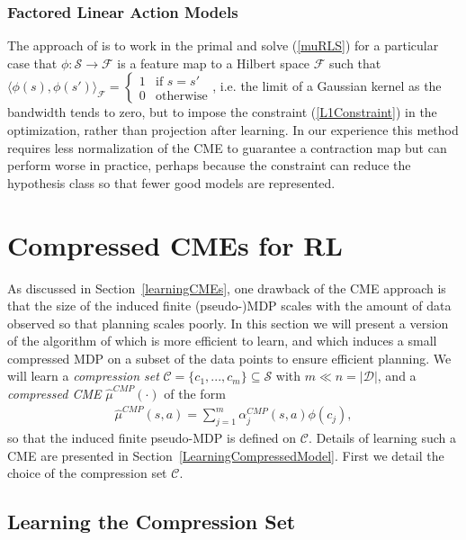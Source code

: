 \documentclass[letterpaper]{article}
\newcommand{\CsabaFLAM}{DBLP:conf/adprl/YaoSPZ14}
\newcommand{\GrunewalderEmbeddingsRL}{GrunewalderEmbeddingsMDP}
\newcommand{\cD}{{\mathcal D}}
\newcommand{\cC}{{\mathcal C}}
\newcommand{\cF}{{\mathcal F}}
\newcommand{\cS}{{\mathcal S}}
\newcommand{\lang}{\langle}
\newcommand{\rang}{\rangle}
\begin{document}
\subsubsection{Factored Linear Action Models}

The approach of \cite{\CsabaFLAM} is to work in the primal and solve (\ref{muRLS}) for a particular case that $\phi:\cS\to\cF$ is a feature map to a Hilbert space $\cF$ such that $\lang\phi(s),\phi(s')\rang_{\cF} = \left\{ \begin{array}{ll} 1 & \mbox{if } s=s' \\ 0 & \mbox{otherwise} \end{array}\right.$, i.e. the limit of a Gaussian kernel as the bandwidth tends to zero, but to impose the constraint (\ref{L1Constraint}) in the optimization, rather than projection after learning. In our experience this method requires less normalization of the CME to guarantee a contraction map but can perform worse in practice, perhaps because the constraint can reduce the hypothesis class so that fewer good models are represented.

\section{Compressed CMEs for RL}  \label{Compression}

As discussed in Section~\ref{learningCMEs}, one drawback of the CME approach is that the size of the induced finite (pseudo-)MDP scales with the amount of data observed so that planning scales poorly. In this section we will present a version of the algorithm of \cite{\GrunewalderEmbeddingsRL} which is more efficient to learn, and which induces a small compressed MDP on a subset of the data points to ensure efficient planning. We will learn a \emph{compression set} $\cC = \{ c_1,...,c_m \}\subseteq \cS$  with $m\ll n = |\cD|$, and a \emph{compressed CME} $\hat\mu^{CMP}(\cdot)$ of the form
\begin{align}
\hat\mu^{CMP}(s,a) = \sum_{j=1}^m \alpha^{CMP}_j(s,a) \phi(c_j), \label{CompressedCME}
\end{align}
so that the induced finite pseudo-MDP is defined on $\cC$. Details of learning such a CME are presented in Section~\ref{LearningCompressedModel}. First we detail the choice of the compression set $\cC$.

\subsection{Learning the Compression Set} \label{learningCompression}
\end{document}
